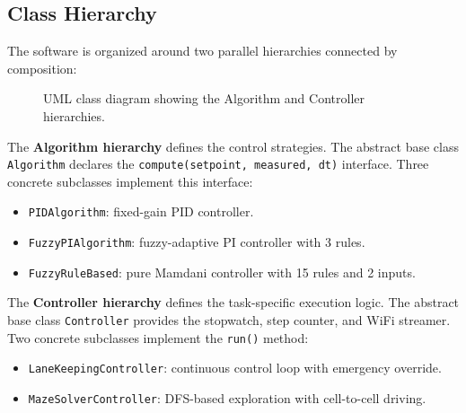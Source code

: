 \subsection{Class Hierarchy}
\label{sec:class-hierarchy}

The software is organized around two parallel hierarchies connected by composition:

\begin{figure}[htbp]
    \centering
    \caption{UML class diagram showing the Algorithm and Controller hierarchies.}
    \label{fig:uml}
\end{figure}

The \textbf{Algorithm hierarchy} defines the control strategies. The abstract base class \texttt{Algorithm} declares the \texttt{compute(setpoint, measured, dt)} interface. Three concrete subclasses implement this interface:

\begin{itemize}
    \item \texttt{PIDAlgorithm}: fixed-gain PID controller.
    \item \texttt{FuzzyPIAlgorithm}: fuzzy-adaptive PI controller with 3 rules.
    \item \texttt{FuzzyRuleBased}: pure Mamdani controller with 15 rules and 2 inputs.
\end{itemize}

The \textbf{Controller hierarchy} defines the task-specific execution logic. The abstract base class \texttt{Controller} provides the stopwatch, step counter, and WiFi streamer. Two concrete subclasses implement the \texttt{run()} method:

\begin{itemize}
    \item \texttt{LaneKeepingController}: continuous control loop with emergency override.
    \item \texttt{MazeSolverController}: DFS-based exploration with cell-to-cell driving.
\end{itemize}


